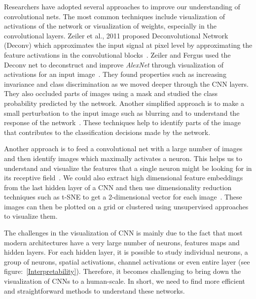 Researchers have adopted several approaches to improve our understanding of convolutional nets. The most common techniques include visualization of activations of the network or visualization of weights, especially in the convolutional layers. Zeiler
et al., 2011 proposed Deconvolutional
Network (Deconv) which approximates the input signal at pixel level by approximating the feature activations in the convolutional blocks~\cite{Deconv}. Zeiler and Fergus used the Deconv net to deconstruct and improve \textit{AlexNet} through visualization of activations for an input image~\cite{ZFNET}. They found properties such as increasing invariance and class discrimination as we moved deeper through the CNN layers. They also occluded parts of images using a mask and studied the class probability predicted by the network. Another simplified approach is to make a small perturbation to the input image such as blurring and to understand the response of the network~\cite{Perturbations}. These techniques help to identify parts of the image that contributes to the classification decisions made by the network.

Another approach is to feed a convolutional net with a large number of images and then identify images which maximally activates a neuron. This helps us to understand and visualize the features that a single neuron might be looking for in its receptive field~\cite{ExciteNeuron}. We could also extract high dimensional feature embeddings from the last hidden layer of a CNN and then use dimensionality reduction techniques such as t-SNE to get a 2-dimensional vector for each image~\cite{t-SNE}. These images can then be plotted on a grid or clustered using unsupervised approaches to visualize them. 

The challenges in the visualization of CNN is mainly due to the fact that most modern architectures have a very large number of neurons, features maps and hidden layers. For each hidden layer, it is possible to study individual neurons, a group of neurons, spatial activations, channel activations or even entire layer (see figure:~\ref{Interpretability}). Therefore, it becomes challenging to bring down the visualization of CNNs to a human-scale. In short, we need to find more efficient and straightforward methods to understand these networks.



